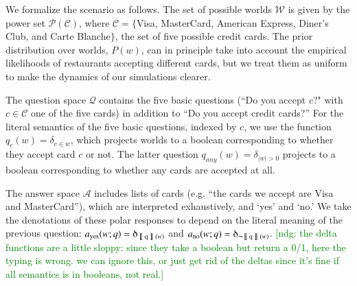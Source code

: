 \documentclass[11pt, floatsintext]{apa6}
\newcommand{\den}[2][]{
\(
\left\llbracket\;\text{#2}\;\right\rrbracket^{#1}
\)
}
\newcommand{\ndg}[1]{\textcolor{Green}{[ndg: #1]}}
\begin{document}
We formalize the scenario as follows. The set of possible worlds $\mathcal{W}$ is given by the power set $\mathcal{P}(\mathcal{C})$, where $\mathcal{C} = \{$Visa, MasterCard, American Express, Diner's Club, and Carte Blanche$\}$, the set of five possible credit cards. %
The prior distribution over worlds, $P(w)$, can in principle take into account the empirical likelihoods of restaurants accepting different cards, but we treat them as uniform to make the dynamics of our simulations clearer. %

The question space $\mathcal{Q}$ contains the five basic questions (``Do you accept $c$?" with $c \in \mathcal{C}$ one of the five cards) in addition to ``Do you accept credit cards?'' For the literal semantics of the five basic questions, indexed by $c$, we use the function $q_c(w) = \delta_{c \in w}$, which projects worlds to a boolean corresponding to whether they accept card $c$ or not.
The latter question $q_{any}(w)  = \delta_{|w| > 0}$ projects to a boolean corresponding to whether any cards are accepted at all. %

The answer space $\mathcal{A}$ includes lists of cards (e.g. ``the cards we accept are Visa and MasterCard''), which are interpreted exhaustively, and  `yes' and `no.' We take the denotations of these polar responses to depend on the literal meaning of the previous question: $a_{\text{yes}}(w;q) = \delta_{\textrm{\den{q}}(w)}$ and $a_{\text{no}}(w;q) = \delta_{\neg \textrm{\den{q}}(w)}$.
\ndg{the delta functions are a little sloppy: since they take a boolean but return a 0/1, here the typing is wrong. we can ignore this, or just get rid of the deltas since it's fine if all semantics is in booleans, not real.}
\end{document}
